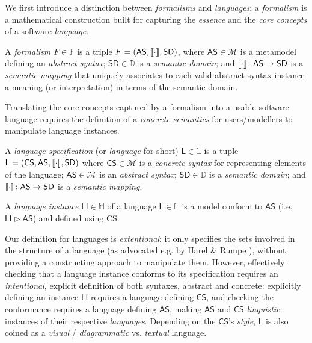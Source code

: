 We first introduce a distinction between \emph{formalisms} and \emph{languages}: 
a \emph{formalism} is a mathematical construction built for capturing the 
\emph{essence} and the \emph{core concepts} of a software \emph{language}. 

\begin{Definition}[Formalism]
   A \emph{formalism} $F\in\mathbb{F}$ is a triple $F = (\mathsf{AS}, 
\llbracket \cdot \rrbracket, \mathsf{SD})$, where $\mathsf{AS}\in\mathcal{M}$ is a metamodel 
defining an \emph{abstract syntax}; $\mathsf{SD}\in\mathbb{D}$ is a 
\emph{semantic domain}; and $\llbracket \cdot \rrbracket 
\colon \mathsf{AS} \to \mathsf{SD}$ is a \emph{semantic mapping} that uniquely 
associates to each valid abstract syntax instance a meaning (or interpretation) 
in terms of the semantic domain.
\end{Definition}

Translating the core concepts captured by a formalism into a usable software 
language requires the definition of a \emph{concrete semantics} for 
users/modellers to manipulate language instances.


 \begin{Definition}[Language]
   A \emph{language specification} (or \emph{language} 
for short) $\mathsf{L}\in\mathbb{L}$ is a tuple $\mathsf{L} = (\mathsf{CS}, 
\mathsf{AS}, \llbracket \cdot \rrbracket, \mathsf{SD})$ where $\mathsf{CS}\in\mathcal{M}$ is a 
\emph{concrete syntax} for representing elements of the language;  
$\mathsf{AS}\in\mathcal{M}$ is an \emph{abstract syntax}; 
$\mathsf{SD}\in\mathbb{D}$ is 
a \emph{semantic domain}; and $\llbracket \cdot \rrbracket \colon \mathsf{AS} \to \mathsf{SD}$ is 
a \emph{semantic mapping}. 

   A \emph{language instance} $\mathsf{LI}\in\mathbb{M}$ of a language 
$\mathsf{L}\in\mathbb{L}$ is a model conform to $\mathsf{AS}$ (i.e. 
$\mathsf{LI} \rhd \mathsf{AS}$) and defined using \textsf{CS}.
\end{Definition}

\smallskip\noindent
Our definition for languages is \emph{extentional}: it only specifies the sets 
involved in the structure of a language (as advocated e.g. by Harel \& Rumpe 
\cite{J:Harel-Rumpe:2004}), without providing a constructing approach to 
manipulate them. However, effectively checking that a language instance 
conforms to its specification requires an \emph{intentional}, explicit 
definition of both syntaxes, abstract and concrete: explicitly defining an 
instance $\mathsf{LI}$ requires a language defining $\mathsf{CS}$, and checking 
the conformance requires a language defining $\mathsf{AS}$, making 
$\mathsf{AS}$ and $\mathsf{CS}$ \emph{linguistic} instances of their respective 
\emph{languages}. Depending on the $\mathsf{CS}$'s \emph{style}, $\mathsf{L}$ 
is also coined as a \emph{visual} / \emph{diagrammatic} vs. \emph{textual} 
language.

